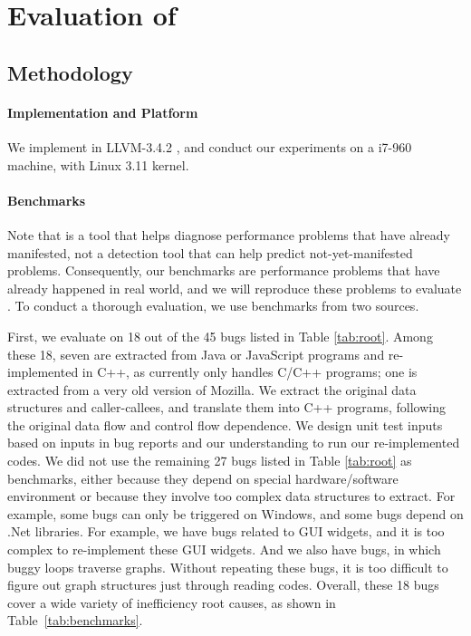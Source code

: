 \section{Evaluation of \Tool}
\label{sec:experiment}

\subsection{Methodology}
\label{sec:result_meth}



\paragraph{Implementation and Platform}
We implement \Tool in LLVM-3.4.2 \cite{llvm}, and conduct our
experiments on a i7-960 machine, with Linux 3.11 kernel. 

\paragraph{Benchmarks}
Note that \Tool is a tool that helps diagnose performance problems that
have already manifested, not a detection tool that can help predict not-yet-manifested
problems. Consequently, our benchmarks are performance problems that have already
happened in real world, and we will reproduce these problems to evaluate \Tool.
To conduct a thorough evaluation, we use
benchmarks from two sources.

First, we evaluate \Tool on 18 out of the 45 bugs listed in Table \ref{tab:root}. 
Among these 18, seven are extracted from Java or JavaScript
programs and re-implemented in C++, as \Tool currently only handles C/C++
programs; one is extracted from a very old version of Mozilla.
{\color{red} We extract the original data structures and caller-callees, 
and translate them into C++ programs, following the original data flow and control flow dependence. 
We design unit test inputs based on inputs in bug reports and our understanding to run our re-implemented codes.}  
We did not use the remaining 27 bugs listed in Table \ref{tab:root}
as benchmarks, 
either because they depend on special hardware/software environment
or because they involve too complex data structures to extract. 
{\color{red} For example, some bugs can only be triggered on Windows, and some bugs depend on .Net libraries. 
For example, we have bugs related to GUI widgets, and it is too complex to re-implement these GUI widgets. 
And we also have bugs, in which buggy loops traverse graphs. 
Without repeating these bugs, it is too difficult to figure out graph structures just through reading codes. }  
Overall, these 18 bugs cover a wide variety of inefficiency root causes, as 
shown in Table~\ref{tab:benchmarks}. 

